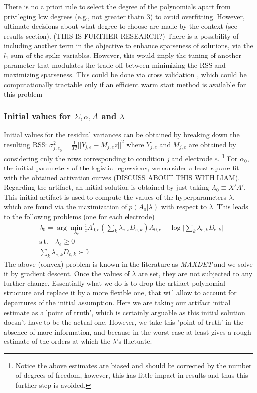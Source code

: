 \documentclass[12pt,letterpaper,fleqn]{article}
\begin{document}
There is no a priori rule to select the degree of the polynomials apart from privileging low degrees (e.g., not greater thatn 3) to avoid overfitting. However, ultimate decisions about what degree to choose are made by the context (see results section). (THIS IS FURTHER RESEARCH?) There is a possibility of including another term in the objective to enhance sparseness of solutions, via the $l_1$ sum of the spike variables. However, this would imply the tuning of another parameter that modulates the trade-off between minimizing the RSS and maximizing sparseness. This could be done via cross validation \cite{HastieEtal01}, which could be computationally tractable only if an efficient warm start method is available for this problem.


\subsubsection{Initial values for $\Sigma, \alpha,A$ and $\lambda$}
Initial values for the residual variances can be obtained by breaking down the resulting RSS: $\sigma^2_{{j,e}_0}=\frac{1}{TI}||Y_{j,e}-M_{j,e}z||^2$ where $Y_{j,e}$ and $M_{j,e}$ are obtained by considering only the rows corresponding to condition $j$ and electrode $e$. \footnote{Notice the above estimates are biased and should be corrected by the number of degrees of freedom, however, this has little impact in results and thus this further step is avoided.} For $\alpha_0$, the initial parameters of the logistic regressions, we consider a least square fit with the obtained activation curves (DISCUSS ABOUT THIS WITH LIAM). Regarding the artifact, an initial solution is obtained by just taking $A_0\equiv X'A'$. This initial artifact is used to compute the values of the hyperparameters $\lambda$, which are found via the maximization of  $p(A_0|\lambda)$ with respect to $\lambda$. This leads to the following problems (one for each electrode)
\begin{eqnarray}\nonumber & \lambda_0=\arg\min_{\lambda_e} \frac{1}{2}A_{0,e}^t\left(\sum_{k}\lambda_{e,k} D_{e,k} \right)A_{0,e}-\log \bigg|\sum_{k}\lambda_{e,k} D_{e,k}\bigg|\\ \nonumber & \text{s.t.} \quad  \lambda_e\geq 0\\ \nonumber & \sum_{k}\lambda_{e,k} D_{e,k} \succ 0
\end{eqnarray}
The above (convex) problem is known in the literature as \textit{MAXDET} \cite{VandenbergheEtal98} and we solve it by gradient descent. Once the values of $\lambda$ are set, they are not subjected to any further change. Essentially what we do is to drop the artifact polynomial structure and replace it by a more flexible one, that will allow to account for departures of the initial assumption. Here we are taking our artifact initial estimate as a 'point of truth', which is certainly arguable as this initial solution doesn't have to be the actual one. However, we take this 'point of truth'  in the absence of more information, and because in the worst case at least gives a rough estimate of the orders at which the  $\lambda$'s fluctuate.\\
\end{document}
